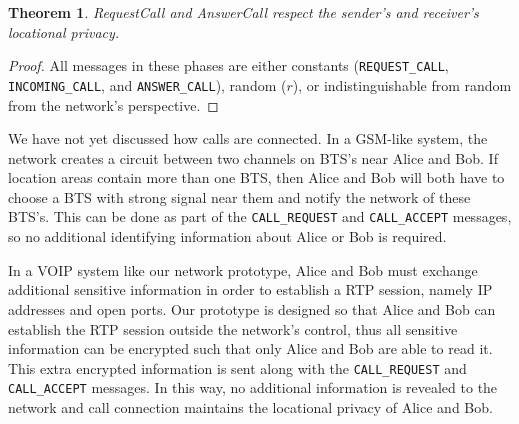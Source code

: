 \documentclass[11pt]{article}
\newtheorem{theorem}{Theorem}
\begin{document}
\begin{theorem}
	\emph{RequestCall} and \emph{AnswerCall} respect the sender's and receiver's locational privacy.
\end{theorem}
\begin{proof}
	All messages in these phases are either constants (\texttt{REQUEST_CALL}, \texttt{INCOMING_CALL}, and \texttt{ANSWER_CALL}), random ($r$), or indistinguishable from random from the network's perspective.
\end{proof}								
We have not yet discussed how calls are connected. In a GSM-like system, the network creates a circuit between two channels on BTS's near Alice and Bob. If location areas contain more than one BTS, then Alice and Bob will both have to choose a BTS with strong signal near them and notify the network of these BTS's. This can be done as part of the \texttt{CALL_REQUEST} and \texttt{CALL_ACCEPT} messages, so no additional identifying information about Alice or Bob is required.

In a VOIP system like our network prototype, Alice and Bob must exchange additional sensitive information in order to establish a RTP session, namely IP addresses and open ports. Our prototype is designed so that Alice and Bob can establish the RTP session outside the network's control, thus all sensitive information can be encrypted such that only Alice and Bob are able to read it. This extra encrypted information is sent along with the \texttt{CALL_REQUEST} and \texttt{CALL_ACCEPT} messages. In this way, no additional information is revealed to the network and call connection maintains the locational privacy of Alice and Bob. 


\end{document}
